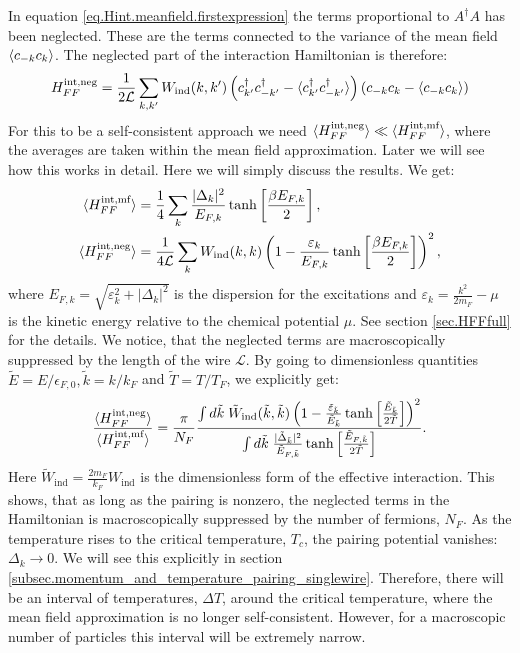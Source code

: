 In equation \eqref{eq.Hint.meanfield.firstexpression} the terms proportional to $A^\dagger A$ has been neglected. These are the terms connected to the variance of the mean field $\braket{c_{-k}c_k}$. The neglected part of the interaction Hamiltonian is therefore:
\begin{equation}
H^{\text{int,neg}}_{FF} = \frac{1}{2\mathcal{L}} \sum_{k, k'} W_{\text{ind}}(k, k') \left(c^\dagger_{k'} c^\dagger_{-k'} - \braket{c^\dagger_{k'} c^\dagger_{-k'}}  \right)\left( c_{-k}c_k - \braket{c_{-k}c_k} \right)
\end{equation}
For this to be a self-consistent approach we need $\braket{H^{\text{int,neg}}_{FF}} \ll \braket{H^{\text{int,mf}}_{FF}}$, where the averages are taken within the mean field approximation. Later we will see how this works in detail. Here we will simply discuss the results. We get:
\begin{align}
\braket{H^{\text{int,mf}}_{FF}}  &= \frac{1}{4}\sum_k \frac{|\Delta_k|^2}{E_{F,k}}\tanh\left[\frac{\beta E_{F,k}}{2}\right], \nonumber \\
\braket{H^{\text{int,neg}}_{FF}} &= \frac{1}{4\mathcal{L}}\sum_k W_{\text{ind}}(k, k)\left(1 - \frac{\varepsilon_k}{E_{F,k}}\tanh\left[\frac{\beta E_{F,k}}{2}\right]  \right)^2, \nonumber
\end{align}
where $E_{F,k} = \sqrt{\varepsilon^2_k + |\Delta_k|^2}$ is the dispersion for the excitations and $\varepsilon_k = \frac{k^2}{2m_F} - \mu$ is the kinetic energy relative to the chemical potential $\mu$. See section \ref{sec.HFFfull} for the details. We notice, that the neglected terms are macroscopically suppressed by the length of the wire $\mathcal{L}$. By going to dimensionless quantities $\tilde{E} = E / \epsilon_{F,0}, \tilde{k} = k / k_F$ and $\tilde{T} = T / T_F$, we explicitly get:
\begin{equation}
\frac{ \braket{ H^{\text{int,neg}}_{FF} } }{ \braket{ H^{\text{int,mf}}_{FF} } } = \frac{\pi}{N_F}\frac{   \int d\tilde{k}\; \tilde{W}_{\text{ind}}(\tilde{k}, \tilde{k}) \left( 1 - \frac{ \tilde{\varepsilon}_{\tilde{k}} }{ \tilde{E}_{\tilde{k}} }\tanh\left[\frac{ \tilde{E}_{\tilde{k}} }{ 2\tilde{T} }\right] \right)^2  }{  \int d\tilde{k}\; \frac{ |\tilde{\Delta}_{\tilde{k}}|^2 }{ \tilde{E}_{F,\tilde{k}} }\tanh\left[\frac{ \tilde{E}_{F,\tilde{k}} }{2 \tilde{T}}\right]   }.
\label{eq.selfconsistency.meanfieldapproximation}
\end{equation}
Here $\tilde{W}_{\text{ind}} = \frac{2m_F}{k_F}W_{\text{ind}}$ is the dimensionless form of the effective interaction. This shows, that as long as the pairing is nonzero, the neglected terms in the Hamiltonian is macroscopically suppressed by the number of fermions, $N_F$. As the temperature rises to the critical temperature, $T_c$, the pairing potential vanishes: $\Delta_k \to 0$. We will see this explicitly in section \ref{subsec.momentum_and_temperature_pairing_singlewire}. Therefore, there will be an interval of temperatures, $\Delta T$, around the critical temperature, where the mean field approximation is no longer self-consistent. However, for a macroscopic number of particles this interval will be extremely narrow. 



